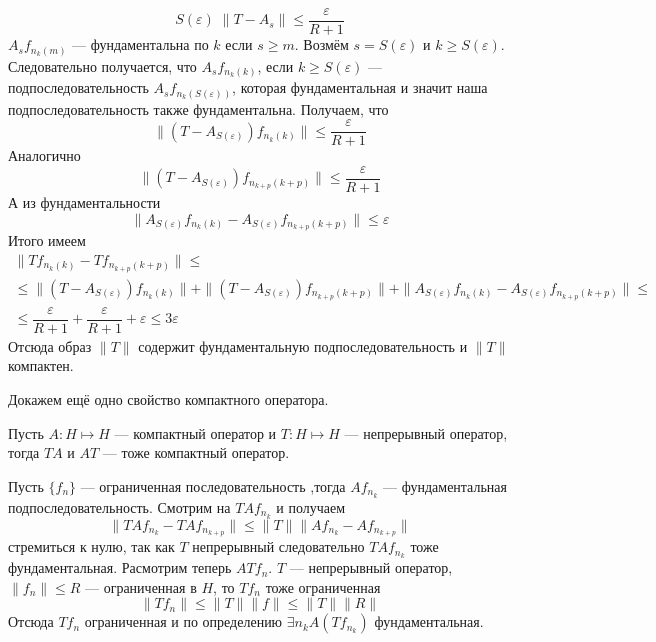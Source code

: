 \documentclass[14pt]{extarticle}
\begin{document}
\begin{Proof}
$$    S(\varepsilon)\; \|T - A_s\| \le \dfrac{\varepsilon}{R + 1}
    $$
    $A_s f_{n_k(m)}$ --- фундаментальна по $k$ если $s \ge m$.
    Возмём $s = S(\varepsilon)$ и $k \ge S(\varepsilon)$.
    Следовательно получается, что $A_s f_{n_k(k)}$, если $k \ge S(\varepsilon)
    $ --- подпоследовательность $A_s f_{n_k(S(\varepsilon))}$, которая
    фундаментальная и значит наша подпоследовательность также фундаментальна.
    Получаем, что 
    $$
    \|(T - A_{S(\varepsilon)})f_{n_k(k)}\| \le \dfrac{\varepsilon}{R + 1}
    $$ 
    Аналогично
    $$
    \|(T - A_{S(\varepsilon)})f_{n_{k + p}(k + p)}\| \le \dfrac{\varepsilon}{
    R + 1}
    $$
    А из фундаментальности
    $$
    \|A_{S(\varepsilon)}f_{n_k(k)} - A_{S(\varepsilon)}f_{n_{k + p}(k + p)}
    \| \le \varepsilon
    $$
    Итого имеем
    \begin{multline*}
        \|T f_{n_k(k)} - T f_{n_{k + p}(k + p)}\| \le \\
        \le \|(T - A_{S(\varepsilon)})f_{n_k(k)}\| + 
        \|(T - A_{S(\varepsilon)})f_{n_{k + p}(k + p)}\| +
        \|A_{S(\varepsilon)}f_{n_k(k)} - A_{S(\varepsilon)}
        f_{n_{k + p}(k + p)}\| \le \\
        \le \dfrac{\varepsilon}{R + 1} + \dfrac{\varepsilon}{R + 1} + 
        \varepsilon \le 3 \varepsilon
    \end{multline*}
    Отсюда образ $\|T\|$ содержит фундаментальную подпоследовательность и
    $\|T\|$ компактен.
\end{Proof}

Докажем ещё одно свойство компактного оператора.
\begin{Utv}
    Пусть $A : H \mapsto H$ --- компактный оператор и $T : H \mapsto H$ --- 
    непрерывный оператор, тогда $TA$ и $AT$ --- тоже компактный оператор.
\end{Utv}
\begin{Proof}
    Пусть $\{f_n\}$ --- ограниченная последовательность ,тогда 
    $A f_{n_k}$ --- фундаментальная подпоследовательность.
    Смотрим на $T A f_{n_k}$ и получаем
    $$
    \|T A f_{n_k} - T A f_{n_{k + p}}\| \le \|T\|
    \|A f_{n_k} - A f_{n_{k + p}}\|
    $$
    стремиться к нулю, так как $T$ непрерывный следовательно $T A f_{n_k}$
    тоже фундаментальная.
    Расмотрим теперь $A T f_n$.
    $T$ --- непрерывный оператор, $\|f_n\| \le R$ --- ограниченная в $H$, то
    $T f_n$ тоже ограниченная
    $$
    \|T f_n\| \le \|T\| \|f\| \le \|T\| \|R\|
    $$
    Отсюда $T f_n$ ограниченная и по определению $\exists n_k A(T f_{n_k})$
    фундаментальная.
\end{Proof}
\end{document}
